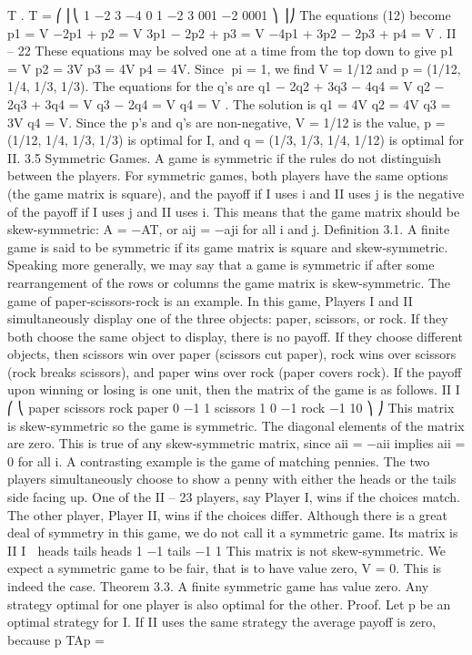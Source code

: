 T .
T =
⎛
⎜⎝
1 −2 3 −4
0 1 −2 3
001 −2
0001
⎞
⎟⎠
The equations (12) become
p1 = V
−2p1 + p2 = V
3p1 − 2p2 + p3 = V
−4p1 + 3p2 − 2p3 + p4 = V .
II – 22
These equations may be solved one at a time from the top down to give
p1 = V p2 = 3V p3 = 4V p4 = 4V.
Since pi = 1, we find V = 1/12 and p = (1/12, 1/4, 1/3, 1/3). The equations for the q’s
are
q1 − 2q2 + 3q3 − 4q4 = V
q2 − 2q3 + 3q4 = V
q3 − 2q4 = V
q4 = V .
The solution is
q1 = 4V q2 = 4V q3 = 3V q4 = V.
Since the p’s and q’s are non-negative, V = 1/12 is the value, p = (1/12, 1/4, 1/3, 1/3) is
optimal for I, and q = (1/3, 1/3, 1/4, 1/12) is optimal for II.
3.5 Symmetric Games. A game is symmetric if the rules do not distinguish between
the players. For symmetric games, both players have the same options (the game matrix
is square), and the payoff if I uses i and II uses j is the negative of the payoff if I uses j
and II uses i. This means that the game matrix should be skew-symmetric: A = −AT,
or aij = −aji for all i and j.
Definition 3.1. A finite game is said to be symmetric if its game matrix is square and
skew-symmetric.
Speaking more generally, we may say that a game is symmetric if after some rearrangement
of the rows or columns the game matrix is skew-symmetric.
The game of paper-scissors-rock is an example. In this game, Players I and II simultaneously
display one of the three objects: paper, scissors, or rock. If they both choose the
same object to display, there is no payoff. If they choose different objects, then scissors win
over paper (scissors cut paper), rock wins over scissors (rock breaks scissors), and paper
wins over rock (paper covers rock). If the payoff upon winning or losing is one unit, then
the matrix of the game is as follows.
II
I
⎛
⎝
paper scissors rock
paper 0 −1 1
scissors 1 0 −1
rock −1 10
⎞
⎠
This matrix is skew-symmetric so the game is symmetric. The diagonal elements of
the matrix are zero. This is true of any skew-symmetric matrix, since aii = −aii implies
aii = 0 for all i.
A contrasting example is the game of matching pennies. The two players simultaneously
choose to show a penny with either the heads or the tails side facing up. One of the
II – 23
players, say Player I, wins if the choices match. The other player, Player II, wins if the
choices differ. Although there is a great deal of symmetry in this game, we do not call it
a symmetric game. Its matrix is
II
I

heads tails
heads 1 −1
tails −1 1
This matrix is not skew-symmetric.
We expect a symmetric game to be fair, that is to have value zero, V = 0. This is
indeed the case.
Theorem 3.3. A finite symmetric game has value zero. Any strategy optimal for one
player is also optimal for the other.
Proof. Let p be an optimal strategy for I. If II uses the same strategy the average payoff
is zero, because
p
TAp = 

